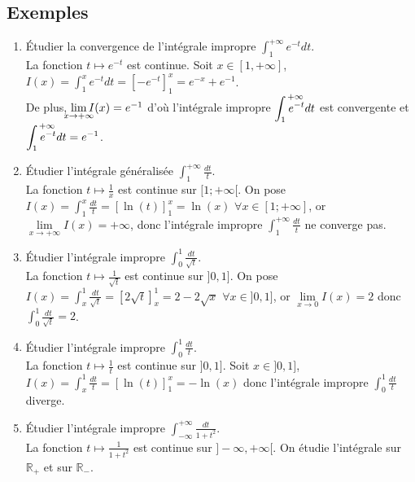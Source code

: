 \documentclass[a4paper,10pt]{book} %
\newcommand{\R}{\mathbb{R}}
\newcommand{\displayAmath}{\displaystyle}
\begin{document}
\subsection{Exemples}
\begin{enumerate}
\item Étudier la convergence de l'intégrale impropre $\displayAmath \int_1^{+\infty}e^{-t}dt$.\\
La fonction $t\mapsto e^{-t}$ est continue. Soit $x\in[1,+\infty]$, $I(x)=\displayAmath\int_{1}^{x}e^{-t}dt=[-e^{-t}]_1^x=e^{-x}+e^{-1}$.\\
De plus, $\lim\limits_{\mathclap{x\rightarrow +\infty}}I(x)=e^{-1}$ d'où l'intégrale impropre $\displayAmath \int_1^{\mathclap{~~~~~+\infty}}e^{-t}dt$ est convergente et $\displayAmath \int_1^{\mathclap{~~~~~+\infty}} e^{-t}dt=e^{-1}$.

\smallskip

\item Étudier l'intégrale généralisée $\displayAmath \int_1^{+\infty}\frac{dt}{t}$.\\
La fonction $t\mapsto \frac{1}{x}$ est continue sur $[1;+\infty[$. On pose $I(x)=\displayAmath\int_1^x\frac{dt}{t}=[\ln(t)]_1^x=\ln(x)$ $\forall x\in [1;+\infty]$, or $\lim\limits_{x\rightarrow +\infty}I(x)=+\infty$, donc l'intégrale impropre $\displayAmath\int_1^{+\infty}\frac{dt}{t}$ ne converge pas.

\smallskip

\item Étudier l’intégrale impropre $\displayAmath\int_0^1\frac{dt}{\sqrt{t}}$.\\
La fonction $t\mapsto \frac{1}{\sqrt{t}}$ est continue sur $]0,1]$. 
On pose $I(x)=\displayAmath\int_x^1\frac{dt}{\sqrt{t}}=[2\sqrt{t}]_x^1=2-2\sqrt{x}$ $\forall x\in ]0,1]$, or $\lim\limits_{x\rightarrow 0}I(x)=2$ donc $\displayAmath\int_0^1\frac{dt}{\sqrt{t}}=2$.

\smallskip

\item Étudier l'intégrale impropre $\displayAmath\int_0^1\frac{dt}{t}$.\\
La fonction $t\mapsto \frac{1}{t}$ est continue sur $]0,1]$. Soit $x\in ]0,1]$, $I(x)=\displayAmath\int_x^1\frac{dt}{t}=[\ln(t)]_1^x=-\ln(x)$ donc l'intégrale impropre $\displayAmath\int_0^1\frac{dt}{t}$ diverge.

\smallskip

\item Étudier l'intégrale impropre $\displayAmath\int_{-\infty}^{+\infty}\frac{dt}{1+t^2}$.\\
La fonction $t\mapsto \frac{1}{1+t^2}$ est continue sur $]-\infty,+\infty[$.
On étudie l'intégrale sur $\R_+$ et sur $\R_-$.


\end{enumerate}
\end{document}
